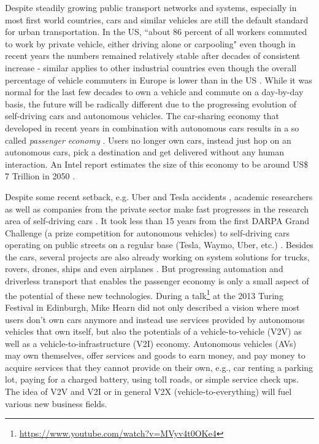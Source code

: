 \documentclass{llncs}
\begin{document}
{		Despite steadily growing public transport networks and systems, especially in most first world countries, cars and similar vehicles are still the default standard for urban transportation. In the US, ``about 86 percent of all workers commuted to work by private vehicle, either driving alone or carpooling" \cite{mckenzie2015drives} even though in recent years the numbers remained relatively stable after decades of consistent increase - similar applies to other industrial countries \cite{netherlandsPublicTransport}\cite{zealand2006car} even though the overall percentage of vehicle commuters in Europe is lower than in the US \cite{commuteUSvsEurope}. While it was normal for the last few decades to own a vehicle and commute on a day-by-day basis, the future will be radically different due to the progressing evolution of self-driving cars and autonomous vehicles. The car-sharing economy that developed in recent years in combination with autonomous cars results in a so called \textit{passenger economy} \cite{intelPassengerEconomy}. Users no longer own cars, instead just hop on an autonomous cars, pick a destination and get delivered without any human interaction. An Intel report estimates the size of this economy to be around US\$ 7 Trillion in 2050 \cite{intelPassengerEconomy}.
		
		Despite some recent setback, e.g. Uber and Tesla accidents \cite{bibid}\cite{bibid}\cite{bibid}, academic researchers as well as companies from the private sector make fast progresses in the research area of self-driving cars \cite{bibid}\cite{bibid}. It took less than 15 years from the first DARPA Grand Challenge (a prize competition for autonomous vehicles) to self-driving cars operating on public streets on a regular base (Tesla, Waymo, Uber, etc.) \cite{bibid}\cite{bibid}\cite{bibid}. Besides the cars, several projects are also already working on system solutions for trucks, rovers, drones, ships and even airplanes \cite{bibid}\cite{bibid}\cite{bibid}\cite{davWhitepaper}. But progressing automation and driverless transport that enables the passenger economy is only a small aspect of the potential of these new technologies. During a talk\footnote{\url{https://www.youtube.com/watch?v=MVyv4t0OKe4}} at the 2013 Turing Festival in Edinburgh, Mike Hearn did not only described a vision where most users don't own cars anymore and instead use services provided by autonomous vehicles that own itself, but also the potentials of a vehicle-to-vehicle (V2V) as well as a vehicle-to-infrastructure (V2I) economy. Autonomous vehicles (AVs) may own themselves, offer services and goods to earn money, and pay money to acquire services that they cannot provide on their own, e.g., car renting a parking lot, paying for a charged battery, using toll roads, or simple service check ups. The idea of V2V and V2I or in general V2X (vehicle-to-everything) will fuel various new business fields. 
		
}
\end{document}
